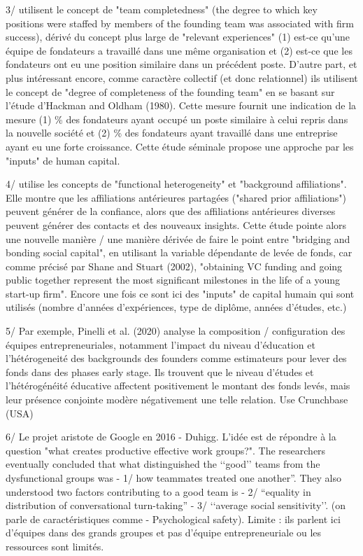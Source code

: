 \documentclass[11pt]{article}
\begin{document}
3/ \citep{roure1986linking, roure1990predictors} utilisent le concept de "team completedness" (the degree to which key positions were staffed by members of the founding team was associated with firm success), dérivé du concept plus large de "relevant experiences" (1) est-ce qu'une équipe de fondateurs a travaillé dans une même organisation et (2) est-ce que les fondateurs ont eu une position similaire dans un précédent poste. D'autre part, et plus intéressant encore, comme caractère collectif (et donc relationnel) ils utilisent le concept de "degree of completeness of the founding team" en se basant sur l'étude d'Hackman and Oldham (1980). Cette mesure fournit une indication de la mesure (1) \% des fondateurs ayant occupé un poste similaire à celui repris dans la nouvelle société et (2) \% des fondateurs ayant travaillé dans une entreprise ayant eu une forte croissance. Cette étude séminale propose une approche par les "inputs" de human capital.

4/ \citep{beckman2007early} utilise les concepts de "functional heterogeneity" et "background affiliations". Elle montre que les affiliations antérieures partagées ("shared prior affiliations") peuvent générer de la confiance, alors que des affiliations antérieures diverses peuvent générer des contacts et des nouveaux insights. Cette étude pointe alors une nouvelle manière / une manière dérivée de faire le point entre "bridging and bonding social capital", en utilisant la variable dépendante de levée de fonds, car comme précisé par Shane and Stuart (2002), "obtaining VC funding and going public together represent the most significant milestones in the life of a young start-up firm". Encore une fois ce sont ici des "inputs" de capital humain qui sont utilisés (nombre d'années d'expériences, type de diplôme, années d'études, etc.)

5/ Par exemple, Pinelli et al. (2020) analyse la composition / configuration des équipes entrepreneuriales, notamment l'impact du niveau d'éducation et l'hétérogeneité des backgrounds des founders comme estimateurs pour lever des fonds dans des phases early stage. Ils trouvent que le niveau d'études et l'hétérogénéité éducative affectent positivement le montant des fonds levés, mais leur présence conjointe modère négativement une telle relation. Use Crunchbase (USA)

6/ Le projet aristote de Google en 2016 - Duhigg. L'idée est de répondre à la question "what creates productive effective work groups?". The researchers eventually concluded that what distinguished the ‘‘good’’ teams from the dysfunctional groups was -	1/ how teammates treated one another”. They also understood two factors contributing to a good team is -	2/ “equality in distribution of conversational turn-taking” -	3/ ‘‘average social sensitivity’’. (on parle de caractéristiques comme -	Psychological safety). Limite : ils parlent ici d'équipes dans des grands groupes et pas d'équipe entrepreneuriale ou les ressources sont limités.
\end{document}
